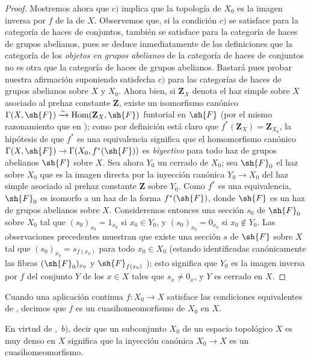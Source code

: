 \begin{proof}
Mostremos ahora que $c)$ implica que la topología de $X_0$ es la imagen inversa por $f$ de la de $X$.
Observemos que, si la condición $c)$ se satisface para la categoría de haces de conjuntos, también se satisface para la categoría de haces de grupos abelianos, pues se deduce inmediatamente de las definiciones  que la categoría de los \emph{objetos en grupos abelianos} de la categoría de haces de conjuntos no es otra que la categoría de haces de grupos abelianos.
Bastará pues probar nuestra afirmación suponiendo satisfecha $c)$ para las categorías de haces de grupos abelianos sobre $X$ y $X_0$.
Ahora bien, si $\mathbf{Z}_X$ denota el haz simple sobre $X$ asociado al prehaz constante $\mathbf{Z}$, existe un isomorfismo canónico $\Gamma(X,\sh{F})\xrightarrow{\sim}\operatorname{Hom}(\mathbf{Z}_X,\sh{F})$ funtorial en $\sh{F}$ (por el mismo razonamiento que en ); como por definición  está claro que $f^*(\mathbf{Z}_X)=\mathbf{Z}_{X_0}$, la hipótesis de que $f^*$ es una equivalencia significa que el homomorfismo canónico $\Gamma(X,\sh{F})\to\Gamma(X_0,f^*(\sh{F}))$ es \emph{biyectivo} para todo haz de grupos abelianos $\sh{F}$ sobre $X$.
Sea ahora $Y_0$ un cerrado de $X_0$; sea $\sh{F}_0$ el haz sobre $X_0$ que es la imagen directa por la inyección canónica $Y_0\to X_0$ del haz simple asociado al prehaz constante $\mathbf{Z}$ sobre $Y_0$.
Como $f^*$ es una equivalencia, $\sh{F}_0$ es isomorfo a un haz de la forma $f^*(\sh{F})$, donde $\sh{F}$ es un haz de grupos abelianos sobre $X$.
Consideremos entonces una sección $s_0$ de $\sh{F}_0$ sobre $X_0$ tal que $(s_0)_{x_0}=1_{x_0}$ si $x_0\in Y_0$, y $(s_0)_{x_0}=0_{x_0}$ si $x_0\notin Y_0$.
Las observaciones precedentes muestran que existe una sección $s$ de $\sh{F}$ sobre $X$ tal que $(s_0)_{x_0}=s_{f(x_0)}$ para todo $x_0\in X_0$ (estando identificadas canónicamente las fibras $(\sh{F}_0)_{x_0}$ y $\sh{F}_{f(x_0)}$ ); esto significa que $Y_0$ es la imagen inversa por $f$ del conjunto $Y$ de los $x\in X$ tales que $s_x\neq 0_x$, y $Y$ es cerrado en $X$.
\end{proof}

\begin{definition}[10.2.2]
\label{IV.10.2.2}
Cuando una aplicación continua $f:X_0\to X$ satisface las condiciones equivalentes de , decimos que $f$ es un cuasihomeomorfismo de $X_0$ en $X$.
\end{definition}

En virtud de ,~$b)$, decir que un subconjunto $X_0$ de un espacio topológico $X$ es muy denso en $X$ significa que la inyección canónica $X_0\to X$ es un cuasihomeomorfismo.

